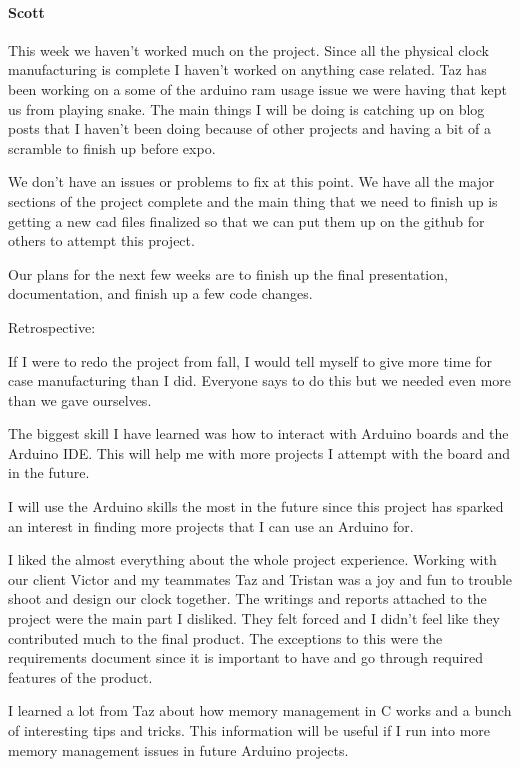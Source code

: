 \documentclass[onecolumn, draftclsnofoot,10pt, compsoc]{IEEEtran}
\begin{document}
\paragraph{Scott}
This week we haven't worked much on the project. Since all the physical clock manufacturing is complete I haven't worked on anything case related. Taz has been working on a some of the arduino ram usage issue we were having that kept us from playing snake. The main things I will be doing is catching up on blog posts that I haven't been doing because of other projects and having a bit of a scramble to finish up before expo.

We don't have an issues or problems to fix at this point. We have all the major sections of the project complete and the main thing that we need to finish up is getting a new cad files finalized so that we can put them up on the github for others to attempt this project.

Our plans for the next few weeks are to finish up the final presentation, documentation, and finish up a few code changes.

Retrospective:

If I were to redo the project from fall, I would tell myself to give more time for case manufacturing than I did. Everyone says to do this but we needed even more than we gave ourselves.

The biggest skill I have learned was how to interact with Arduino boards and the Arduino IDE. This will help me with more projects I attempt with the board and in the future.

I will use the Arduino skills the most in the future since this project has sparked an interest in finding more projects that I can use an Arduino for.

I liked the almost everything about the whole project experience. Working with our client Victor and my teammates Taz and Tristan was a joy and fun to trouble shoot and design our clock together. The writings and reports attached to the project were the main part I disliked. They felt forced and I didn't feel like they contributed much to the final product. The exceptions to this were the requirements document since it is important to have and go through required features of the product.

I learned a lot from Taz about how memory management in C works and a bunch of interesting tips and tricks. This information will be useful if I run into more memory management issues in future Arduino projects.
\end{document}
